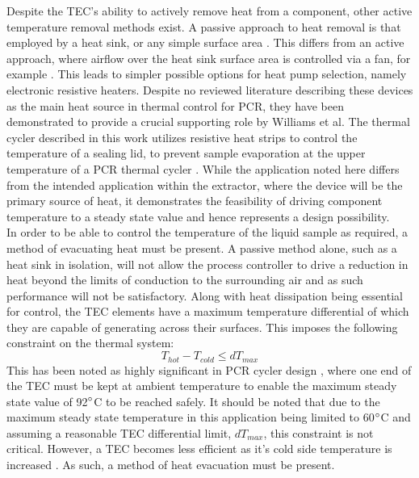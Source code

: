 Despite the TEC's ability to actively remove heat from a component, other active temperature removal methods exist. A passive approach to heat removal is that employed by a heat sink, or any simple surface area \cite{2006289990179}\cite{20144600208116}. This differs from an active approach, where airflow over the heat sink surface area is controlled via a fan, for example \cite{2006289990179}. This leads to simpler possible options for heat pump selection, namely electronic resistive heaters. Despite no reviewed literature describing these devices as the main heat source in thermal control for PCR, they have been demonstrated to provide a crucial supporting role by Williams et al. The thermal cycler described in this work utilizes resistive heat strips to control the temperature of a sealing lid, to prevent sample evaporation at the upper temperature of a PCR thermal cycler \cite{7238517}. While the application noted here differs from the intended application within the extractor, where the device will be the primary source of heat, it demonstrates the feasibility of driving component temperature to a steady state value and hence represents a design possibility.\\

In order to be able to control the temperature of the liquid sample as required, a method of evacuating heat must be present. A passive method alone, such as a heat sink in isolation, will not allow the process controller to drive a reduction in heat beyond the limits of conduction to the surrounding air \cite{20144600208116} and as such performance will not be satisfactory. Along with heat dissipation being essential for control, the TEC elements have a maximum temperature differential of which they are capable of generating across their surfaces. This imposes the following constraint on the thermal system:
\begin{equation}
T_{hot} - T_{cold} \leq dT_{max}
\end{equation}
This has been noted as highly significant in PCR cycler design \cite{20160801988967}, where one end of the TEC must be kept at ambient temperature to enable the maximum steady state value of 92$\degree$C to be reached safely. It should be noted that due to the maximum steady state temperature in this application being limited to 60$\degree$C and assuming a reasonable TEC differential limit, $dT_{max}$, this constraint is not critical. However, a TEC becomes less efficient as it's cold side temperature is increased \cite{20070113880}. As such, a method of heat evacuation must be present.\\

